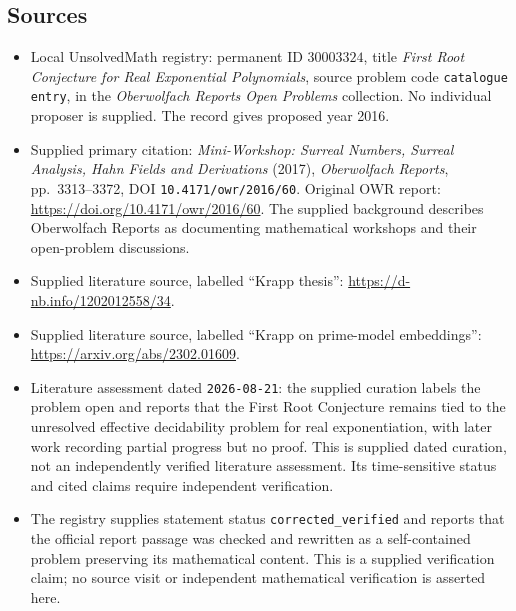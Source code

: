 \documentclass[11pt]{article}
\begin{document}
\subsection{Sources}
\begin{itemize}
\item Local UnsolvedMath registry: permanent ID \(30003324\), title \emph{First Root Conjecture for Real Exponential Polynomials}, source problem code \texttt{catalogue entry}, in the \emph{Oberwolfach Reports Open Problems} collection. No individual proposer is supplied. The record gives proposed year 2016.
\item Supplied primary citation: \emph{Mini-Workshop: Surreal Numbers, Surreal Analysis, Hahn Fields and Derivations} (2017), \emph{Oberwolfach Reports}, pp.\ 3313--3372, DOI \texttt{10.4171/owr/2016/60}. Original OWR report: \url{https://doi.org/10.4171/owr/2016/60}. The supplied background describes Oberwolfach Reports as documenting mathematical workshops and their open-problem discussions.
\item Supplied literature source, labelled ``Krapp thesis'': \url{https://d-nb.info/1202012558/34}.
\item Supplied literature source, labelled ``Krapp on prime-model embeddings'': \url{https://arxiv.org/abs/2302.01609}.
\item Literature assessment dated \texttt{2026-08-21}: the supplied curation labels the problem open and reports that the First Root Conjecture remains tied to the unresolved effective decidability problem for real exponentiation, with later work recording partial progress but no proof. This is supplied dated curation, not an independently verified literature assessment. Its time-sensitive status and cited claims require independent verification.
\item The registry supplies statement status \texttt{corrected\_verified} and reports that the official report passage was checked and rewritten as a self-contained problem preserving its mathematical content. This is a supplied verification claim; no source visit or independent mathematical verification is asserted here.
\end{itemize}
\end{document}
